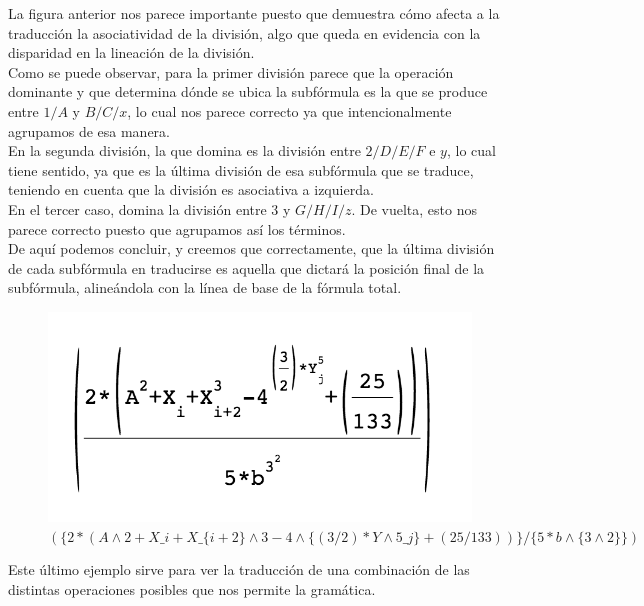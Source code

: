 \indent La figura anterior nos parece importante puesto que demuestra cómo afecta a la traducción la asociatividad de la división, algo que queda en evidencia con la disparidad en la lineación de la división.\\
\indent Como se puede observar, para la primer división parece que la operación dominante y que determina dónde se ubica la subfórmula es la que se produce entre $1/A$ y $B/C/x$, lo cual nos parece correcto ya que intencionalmente agrupamos de esa manera.\\ 
\indent En la segunda división, la que domina es la división entre $2/D/E/F$ e $y$, lo cual tiene sentido, ya que es la última división de esa subfórmula que se traduce, teniendo en cuenta que la división es asociativa a izquierda.\\
\indent En el tercer caso, domina la división entre 3 y $G/H/I/z$. De vuelta, esto nos parece correcto puesto que agrupamos así los términos.\\
\indent De aquí podemos concluir, y creemos que correctamente, que la última división de cada subfórmula en traducirse es aquella que dictará la posición final de la subfórmula, alineándola con la línea de base de la fórmula total.\\

\begin{figure}[H]
      \begin{centering}
        \includegraphics{imgs/i}
        \caption{$(\{2*(A\wedge2+X\_i+X\_\{i+2\}\wedge3-4\wedge\{(3/2)*Y\wedge5\_j\}+(25/133))\}/\{5*b\wedge\{3\wedge2\}\})$}
       \end{centering}
\end{figure}

\indent Este último ejemplo sirve para ver la traducción de una combinación de las distintas operaciones posibles que nos permite la gramática.\\

